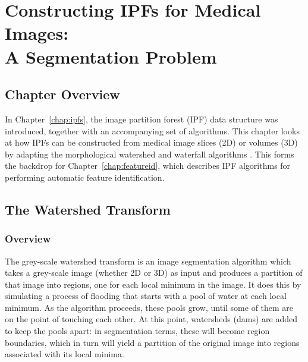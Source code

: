\chapter[Constructing IPFs for Medical Images: A Segmentation Problem]{Constructing IPFs for Medical Images:\\A Segmentation Problem}

\section{Chapter Overview}

In Chapter~\ref{chap:ipfs}, the image partition forest (IPF) data structure was introduced, together with an accompanying set of algorithms. This chapter looks at how IPFs can be constructed from medical image slices (2D) or volumes (3D) by adapting the morphological watershed and waterfall algorithms \cite{beucher94,marcotegui05}. This forms the backdrop for Chapter~\ref{chap:featureid}, which describes IPF algorithms for performing automatic feature identification.

\section{The Watershed Transform}

\subsection{Overview}

The grey-scale watershed transform is an image segmentation algorithm which takes a grey-scale image (whether 2D or 3D) as input and produces a partition of that image into regions, one for each local minimum in the image. It does this by simulating a process of flooding that starts with a pool of water at each local minimum. As the algorithm proceeds, these pools grow, until some of them are on the point of touching each other. At this point, watersheds (dams) are added to keep the pools apart: in segmentation terms, these will become region boundaries, which in turn will yield a partition of the original image into regions associated with its local minima.

